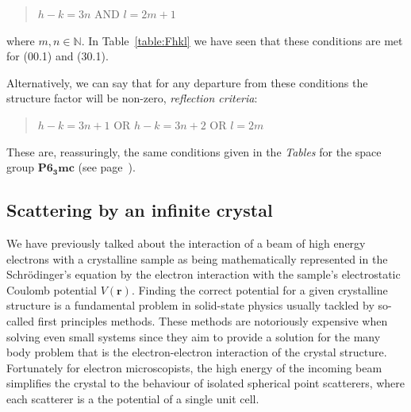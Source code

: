 \begin{quote}
  \hspace{1cm}  $h-k=3n$ \hspace{0.5cm} AND \hspace{0.5cm} $l=2m+1$
\end{quote}
where $m,n \in \mathbb{N}$. In Table~\ref{table:Fhkl} we have seen that these conditions are met for \hkl(00.1) and \hkl(30.1). 

Alternatively, we can say that for any departure from these conditions the structure factor will be non-zero, \ie \emph{reflection criteria}:
\begin{quote}
  \hspace{1cm}  $h-k=3n+1$ \hspace{0.5cm} OR \hspace{0.5cm} $h-k=3n+2$  \hspace{0.5cm}  OR  \hspace{0.5cm} $l=2m$
\end{quote}

These are, reassuringly, the same conditions given in the \textit{Tables} for the space group $\mathbf{P6_3mc}$ (see page~\pageref{Fig:ITC}).



%
\subsection{Scattering by an infinite crystal }
\label{sec:ICpotential}

We have previously talked about the interaction of a beam of high energy electrons with a crystalline sample as being mathematically represented in the Schr\"{o}dinger's equation by the electron interaction with the sample's electrostatic Coulomb potential $V(\mathbf{r})$. Finding the correct potential for a given crystalline structure is a fundamental problem in solid-state physics usually tackled by so-called first principles methods. These methods are notoriously expensive when solving even small systems since they aim to provide a solution for the many body problem that is the electron-electron interaction of the crystal structure. Fortunately for electron microscopists, the high energy of the incoming beam simplifies the crystal to the behaviour of isolated spherical point scatterers, where each scatterer is a the potential of a single unit cell. 


